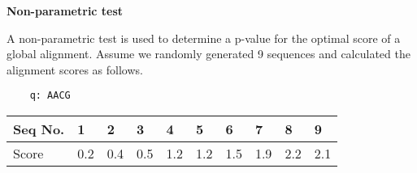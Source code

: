 \question \textbf{Non-parametric test}
  
A non-parametric test is used to determine a p-value for the optimal score of a global alignment. Assume we randomly generated 9 sequences and calculated the alignment scores as follows.

\begin{verbatim}
    q: AACG
\end{verbatim}

\begin{table}[H]
\centering
\begin{tabular}{|l|l|l|l|l|l|l|l|l|l|}
\hline
Seq No. & 1   & 2   & 3   & 4   & 5   & 6   & 7   & 8   & 9   \\ \hline
Score   & 0.2 & 0.4 & 0.5 & 1.2 & 1.2 & 1.5 & 1.9 & 2.2 & 2.1 \\ \hline
\end{tabular}
\end{table}

\vspace{0.1 in}

